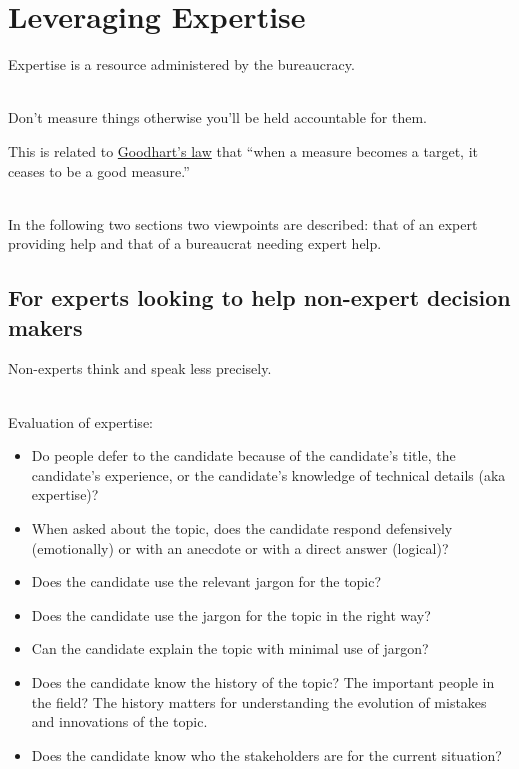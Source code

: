 \section{Leveraging Expertise\label{sec:expertise}}

Expertise is a resource administered by the bureaucracy.

\ \\

Don't measure things otherwise you'll be held accountable for them.

This is related to \href{https://en.wikipedia.org/wiki/Goodhart\%27s_law}{Goodhart's law} that ``when a measure becomes a target, it ceases to be a good measure.''

\ \\

In the following two sections two viewpoints are described: that of an expert providing help and that of a bureaucrat needing expert help. 

\subsection*{For experts looking to help non-expert decision makers}

Non-experts think and speak less precisely.

\ \\

Evaluation of expertise:
\begin{itemize}
    \item Do people defer to the candidate because of the candidate's title, the candidate's experience, or the candidate's knowledge of technical details (aka expertise)?
    \item When asked about the topic, does the candidate respond defensively (emotionally) or with an anecdote or with a direct answer (logical)?
    \item Does the candidate use the relevant jargon for the topic?
    \item Does the candidate use the jargon for the topic in the right way?
    \item Can the candidate explain the topic with minimal use of jargon?
    \item Does the candidate know the history of the topic? The important people in the field? The history matters for understanding the evolution of mistakes and innovations of the topic.
    \item Does the candidate know who the stakeholders are for the current situation? 
\end{itemize}


